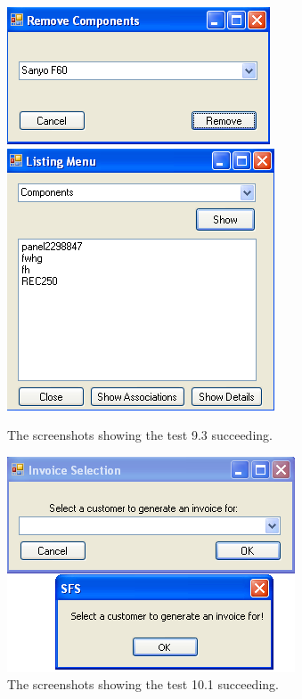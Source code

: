 \begin{figure}[ht]
\centering
\includegraphics[scale=0.5]{test9dot3scrot1}
\includegraphics[scale=0.5]{test9dot3scrot2}
\caption{The screenshots showing the test 9.3 succeeding.}
\label{fig:test_ninedotthree}
\end{figure}

\begin{figure}[ht]
\centering
\includegraphics[scale=0.5]{test10dot1}
\caption{The screenshots showing the test 10.1 succeeding.}
\label{fig:test_tendotone}
\end{figure}

